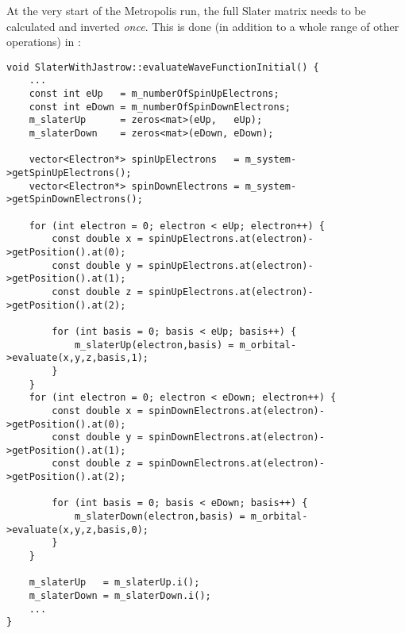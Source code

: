 \documentclass[../../master.tex]{subfiles}
\begin{document}
At the very start of the Metropolis run, the full Slater matrix needs to be calculated and inverted \emph{once}. This is done (in addition to a whole range of other operations) in :
\begin{lstlisting}[language={[std]c++}]
void SlaterWithJastrow::evaluateWaveFunctionInitial() {
    ...
    const int eUp   = m_numberOfSpinUpElectrons;
    const int eDown = m_numberOfSpinDownElectrons;
    m_slaterUp      = zeros<mat>(eUp,   eUp);
    m_slaterDown    = zeros<mat>(eDown, eDown);

    vector<Electron*> spinUpElectrons   = m_system->getSpinUpElectrons();
    vector<Electron*> spinDownElectrons = m_system->getSpinDownElectrons();

    for (int electron = 0; electron < eUp; electron++) {
        const double x = spinUpElectrons.at(electron)->getPosition().at(0);
        const double y = spinUpElectrons.at(electron)->getPosition().at(1);
        const double z = spinUpElectrons.at(electron)->getPosition().at(2);

        for (int basis = 0; basis < eUp; basis++) {
            m_slaterUp(electron,basis) = m_orbital->evaluate(x,y,z,basis,1);
        }
    }
    for (int electron = 0; electron < eDown; electron++) {
        const double x = spinDownElectrons.at(electron)->getPosition().at(0);
        const double y = spinDownElectrons.at(electron)->getPosition().at(1);
        const double z = spinDownElectrons.at(electron)->getPosition().at(2);

        for (int basis = 0; basis < eDown; basis++) {
            m_slaterDown(electron,basis) = m_orbital->evaluate(x,y,z,basis,0);
        }
    }

    m_slaterUp   = m_slaterUp.i();
    m_slaterDown = m_slaterDown.i();
    ...
}
\end{lstlisting}
\end{document}
